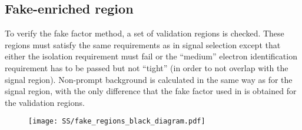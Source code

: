 \subsection{Fake-enriched region}
To verify the fake factor method, a set of validation regions is checked. 
These regions must satisfy the same requirements as
in signal selection except that either the isolation requirement must fail 
or the ``medium'' electron identification requirement has to be passed
but not ``tight'' (in order to not overlap with the signal region).
Non-prompt background is calculated in the same way as for the signal region, 
with the only difference that the fake factor used
in  is obtained for the validation regions. 
\toAsk[phrasing?]


\begin{figure}[h]
\begin{center}
\texttt{[image: SS/fake\_regions\_black\_diagram.pdf]}
\caption{\toDo}
\label{fig:fake_regions}
\end{center}
\end{figure}





